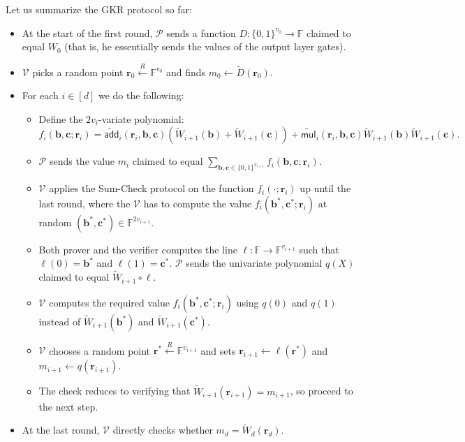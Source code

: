 \documentclass{gkr-template}
\begin{document}
\newpage
\begin{proposition}
Let us summarize the GKR protocol so far:
\begin{itemize}
    \item At the start of the first round, $\mathcal{P}$ sends a function 
    $D: \{0,1\}^{v_0} \to \mathbb{F}$ claimed to equal $W_0$ (that is, he 
    essentially sends the values of the output layer gates).
    \item $\mathcal{V}$ picks a random point $\mathbf{r}_0 \xleftarrow{R}
    \mathbb{F}^{v_0}$ and finds $m_0 \gets \widetilde{D}(\mathbf{r}_0)$.
    \item For each $i \in [d]$ we do the following:
    \begin{itemize}
        \item Define the $2v_i$-variate polynomial:
        \begin{equation*}
            f_i(\boldsymbol{b}, \boldsymbol{c}; \mathbf{r}_i) = \widetilde{\mathsf{add}}_i(\mathbf{r}_i, \boldsymbol{b}, \boldsymbol{c})(\widetilde{W}_{i+1}(\boldsymbol{b}) + \widetilde{W}_{i+1}(\boldsymbol{c})) + \widetilde{\mathsf{mul}}_i(\mathbf{r}_i, \boldsymbol{b}, \boldsymbol{c})\widetilde{W}_{i+1}(\boldsymbol{b})\widetilde{W}_{i+1}(\boldsymbol{c}).
        \end{equation*}
        \item $\mathcal{P}$ sends the value $m_i$ claimed to equal
        $\sum_{\boldsymbol{b}, \boldsymbol{c} \in
        \{0,1\}^{v_{i+1}}}f_i(\boldsymbol{b}, \boldsymbol{c}; \mathbf{r}_i)$.
        \item $\mathcal{V}$ applies the Sum-Check protocol on the function
        $f_i(\cdot; \mathbf{r}_i)$ up until the last round, where the
        $\mathcal{V}$ has to compute the value $f_i(\boldsymbol{b}^*,
        \boldsymbol{c}^*; \mathbf{r}_i)$ at random $(\boldsymbol{b}^*,
        \boldsymbol{c}^*) \in \mathbb{F}^{2v_{i+1}}$.
        \item Both prover and the verifier computes the line $\ell: \mathbb{F} \to
        \mathbb{F}^{v_{i+1}}$ such that $\ell(0)=\boldsymbol{b}^*$ and
        $\ell(1)=\boldsymbol{c}^*$. $\mathcal{P}$ sends the univariate
        polynomial $q(X)$ claimed to equal $\widetilde{W}_{i+1} \circ \ell$.
        \item $\mathcal{V}$ computes the required value $f_i(\boldsymbol{b}^*,
        \boldsymbol{c}^*; \mathbf{r}_i)$ using $q(0)$ and $q(1)$ instead of 
        $\widetilde{W}_{i+1}(\boldsymbol{b}^*)$ and $\widetilde{W}_{i+1}(\boldsymbol{c}^*)$.
        \item $\mathcal{V}$ chooses a random point $\mathbf{r}^* \xleftarrow{R}
        \mathbb{F}^{v_{i+1}}$ and sets $\mathbf{r}_{i+1} \gets
        \ell(\mathbf{r}^*)$ and $m_{i+1} \gets q(\mathbf{r}_{i+1})$.
        \item The check reduces to verifying that
        $\widetilde{W}_{i+1}(\mathbf{r}_{i+1}) = m_{i+1}$, so proceed to the
        next step.
    \end{itemize}
    \item At the last round, $\mathcal{V}$ directly checks whether
    $m_d=\widetilde{W}_d(\mathbf{r}_d)$.
\end{itemize}
\end{proposition}
\end{document}
